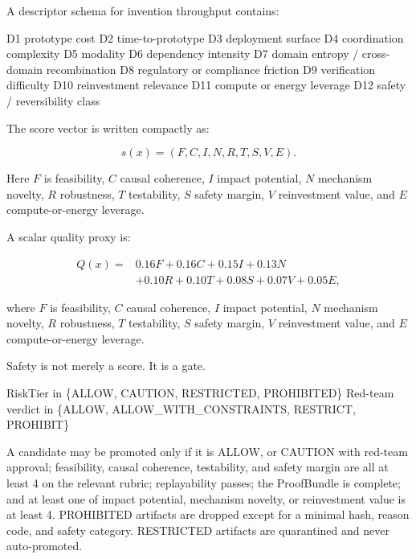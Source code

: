 \documentclass[
  11pt,
]{article}
\newenvironment{Shaded}{}{}
\newcommand{\NormalTok}[1]{#1}
\begin{document}
A descriptor schema for invention throughput contains:

\begin{Shaded}
\begin{Highlighting}[]
\NormalTok{D1 prototype cost}
\NormalTok{D2 time{-}to{-}prototype}
\NormalTok{D3 deployment surface}
\NormalTok{D4 coordination complexity}
\NormalTok{D5 modality}
\NormalTok{D6 dependency intensity}
\NormalTok{D7 domain entropy / cross{-}domain recombination}
\NormalTok{D8 regulatory or compliance friction}
\NormalTok{D9 verification difficulty}
\NormalTok{D10 reinvestment relevance}
\NormalTok{D11 compute or energy leverage}
\NormalTok{D12 safety / reversibility class}
\end{Highlighting}
\end{Shaded}

The score vector is written compactly as:

\[
s(x)=(F,C,I,N,R,T,S,V,E).
\]

Here \(F\) is feasibility, \(C\) causal coherence, \(I\) impact
potential, \(N\) mechanism novelty, \(R\) robustness, \(T\) testability,
\(S\) safety margin, \(V\) reinvestment value, and \(E\)
compute-or-energy leverage.

A scalar quality proxy is:

\[
\begin{aligned}
Q(x)=&
0.16F + 0.16C + 0.15I + 0.13N\\
&+0.10R + 0.10T + 0.08S + 0.07V + 0.05E,
\end{aligned}
\]

where \(F\) is feasibility, \(C\) causal coherence, \(I\) impact
potential, \(N\) mechanism novelty, \(R\) robustness, \(T\) testability,
\(S\) safety margin, \(V\) reinvestment value, and \(E\)
compute-or-energy leverage.

Safety is not merely a score. It is a gate.

\begin{Shaded}
\begin{Highlighting}[]
\NormalTok{RiskTier in \{ALLOW, CAUTION, RESTRICTED, PROHIBITED\}}
\NormalTok{Red{-}team verdict in \{ALLOW, ALLOW\_WITH\_CONSTRAINTS, RESTRICT, PROHIBIT\}}
\end{Highlighting}
\end{Shaded}

A candidate may be promoted only if it is ALLOW, or CAUTION with
red-team approval; feasibility, causal coherence, testability, and
safety margin are all at least 4 on the relevant rubric; replayability
passes; the ProofBundle is complete; and at least one of impact
potential, mechanism novelty, or reinvestment value is at least 4.
PROHIBITED artifacts are dropped except for a minimal hash, reason code,
and safety category. RESTRICTED artifacts are quarantined and never
auto-promoted.
\end{document}
